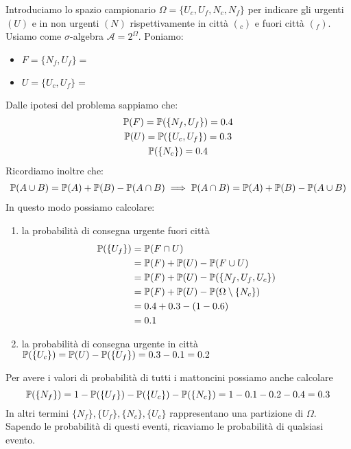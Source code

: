 Introduciamo lo spazio campionario $\Omega =\{U_{c} ,U_{f} ,N_{c} ,N_{f}\}$ per indicare gli urgenti $(U)$ e in non urgenti $(N)$ rispettivamente in città $(_{c})$ e fuori città $(_{f})$. Usiamo come $\sigma $-algebra $\mathcal{A} =2^{\Omega }$. Poniamo:
\begin{itemize}
	\item $F=\{N_{f} ,U_{f}\} =$ 
	\item $U=\{U_{c} ,U_{f}\} =$ 
\end{itemize}
Dalle ipotesi del problema sappiamo che:
\begin{gather*}
	\mathbb{P}(F) =\mathbb{P}(\{N_{f} ,U_{f}\}) =0.4\\
	\mathbb{P}(U) =\mathbb{P}(\{U_{c} ,U_{f}\}) =0.3\\
	\mathbb{P}(\{N_{c}\}) =0.4
\end{gather*}
Ricordiamo inoltre che:
\begin{gather*}
	\mathbb{P}(A\cup B) =\mathbb{P}(A) +\mathbb{P}(B) -\mathbb{P}(A\cap B) \implies \mathbb{P}(A\cap B) =\mathbb{P}(A) +\mathbb{P}(B) -\mathbb{P}(A\cup B)
\end{gather*}
In questo modo possiamo calcolare:
\begin{enumerate}
	\item la probabilità di consegna urgente fuori città
	\begin{align*}
		\mathbb{P}(\{U_{f}\}) & =\mathbb{P}(F\cap U)\\
		& =\mathbb{P}(F) +\mathbb{P}(U) -\mathbb{P}(F\cup U)\\
		& =\mathbb{P}(F) +\mathbb{P}(U) -\mathbb{P}(\{N_{f} ,U_{f} ,U_{c}\})\\
		& =\mathbb{P}(F) +\mathbb{P}(U) -\mathbb{P}(\Omega \setminus \{N_{c}\})\\
		& =0.4+0.3-(1-0.6)\\
		& =0.1
	\end{align*}
	\item la probabilità di consegna urgente in città
	$\mathbb{P}(\{U_{c}\}) =\mathbb{P}(U) -\mathbb{P}(\{U_{f}\}) =0.3-0.1=0.2$
\end{enumerate}
\begin{oss}
	Per avere i valori di probabilità di tutti i mattoncini possiamo anche calcolare
	\begin{equation*}
		\mathbb{P}(\{N_{f}\}) =1-\mathbb{P}(\{U_{f}\}) -\mathbb{P}(\{U_{c}\}) -\mathbb{P}(\{N_{c}\}) =1-0.1-0.2-0.4=0.3
	\end{equation*}
	In altri termini $\{N_{f}\} ,\{U_{f}\} ,\{N_{c}\} ,\{U_{c}\}$ rappresentano una partizione di $\Omega $. Sapendo le probabilità di questi eventi, ricaviamo le probabilità di qualsiasi evento.
\end{oss}

